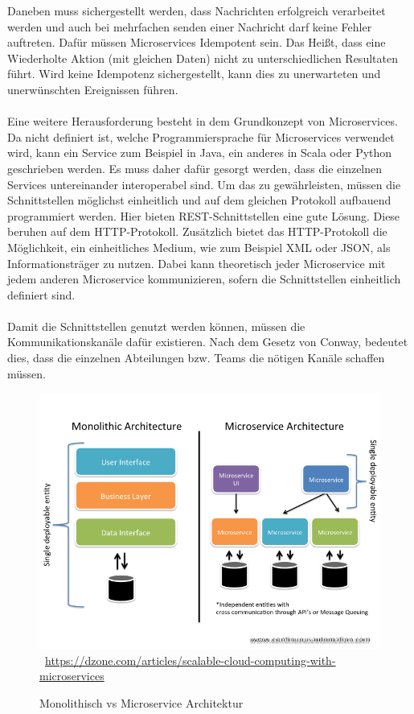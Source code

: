 Daneben muss sichergestellt werden, dass Nachrichten erfolgreich verarbeitet werden und auch bei mehrfachen senden einer Nachricht darf keine Fehler auftreten. Dafür müssen Microservices Idempotent sein. Das Heißt, dass eine Wiederholte Aktion (mit gleichen Daten) nicht zu unterschiedlichen Resultaten führt. Wird keine Idempotenz sichergestellt, kann dies zu unerwarteten und unerwünschten Ereignissen führen.
\\\\
Eine weitere Herausforderung besteht in dem Grundkonzept von Microservices. Da nicht definiert ist, welche Programmiersprache für Microservices verwendet wird, kann ein Service zum Beispiel in Java, ein anderes in Scala oder Python geschrieben werden. Es muss daher dafür gesorgt werden, dass die einzelnen Services untereinander interoperabel sind. Um das zu gewährleisten, müssen die Schnittstellen möglichst einheitlich und auf dem gleichen Protokoll aufbauend programmiert werden. Hier bieten REST-Schnittstellen eine gute Lösung. Diese beruhen auf dem HTTP-Protokoll. Zusätzlich bietet das HTTP-Protokoll die Möglichkeit, ein einheitliches Medium, wie zum Beispiel XML oder JSON, als Informationsträger zu nutzen. Dabei kann theoretisch jeder Microservice mit jedem anderen Microservice kommunizieren, sofern die Schnittstellen einheitlich definiert sind.
\\\\
Damit die Schnittstellen genutzt werden können, müssen die Kommunikationskanäle dafür existieren. Nach dem Gesetz von Conway, bedeutet dies, dass die einzelnen Abteilungen bzw. Teams die nötigen Kanäle schaffen müssen.
\newpage
\begin{figure}[htb]
	\centering 
	\includegraphics[width=\linewidth]{content/images/570495-slide1}\
	\quelle\url{https://dzone.com/articles/scalable-cloud-computing-with-microservices}
	\caption{Monolithisch vs Microservice Architektur\\}
	\label{fig:MonoVSMicroArchitektur} 
\end{figure}
